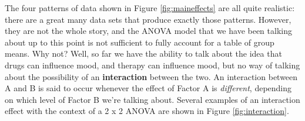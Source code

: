\documentclass[
  11pt,
  a4paper,
  twoside,symmetric,openright]{book}
\theoremstyle{break}
\theoremstyle{break}
\begin{document}
The four patterns of data shown in Figure \ref{fig:maineffects} are all quite realistic: there are a great many data sets that produce exactly those patterns. However, they are not the whole story, and the ANOVA model that we have been talking about up to this point is not sufficient to fully account for a table of group means. Why not? Well, so far we have the ability to talk about the idea that drugs can influence mood, and therapy can influence mood, but no way of talking about the possibility of an \textbf{interaction} between the two. An interaction between A and B is said to occur whenever the effect of Factor A is \emph{different}, depending on which level of Factor B we're talking about. Several examples of an interaction effect with the context of a 2 x 2 ANOVA are shown in Figure \ref{fig:interaction}.

\begin{figure}


\end{figure}
\end{document}

